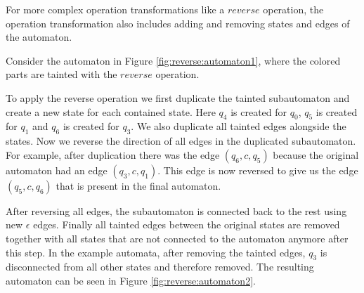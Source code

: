 For more complex operation transformations like a $reverse$ operation, the operation transformation also includes adding and removing states and edges of the automaton.

Consider the automaton in Figure \ref{fig:reverse:automaton1}, where the colored parts are tainted with the $reverse$ operation.

To apply the reverse operation we first duplicate the tainted subautomaton and create a new state for each contained state. Here $q_4$ is created for $q_0$, $q_5$ is created for $q_1$ and $q_6$ is created for $q_3$. We also duplicate all tainted edges alongside the states.
Now we reverse the direction of all edges in the duplicated subautomaton.
For example, after duplication there was the edge $(q_6, c, q_5)$ because the original automaton had an edge $(q_3,c,q_1)$. This edge is now reversed to give us the edge $(q_5, c, q_6)$ that is present in the final automaton.

After reversing all edges, the subautomaton is connected back to the rest using new $\epsilon$ edges.
Finally all tainted edges between the original states are removed together with all states that are not connected to the automaton anymore after this step.
In the example automata, after removing the tainted edges, $q_3$ is disconnected from all other states and therefore removed.
The resulting automaton can be seen in Figure \ref{fig:reverse:automaton2}.

